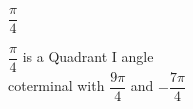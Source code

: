 {$\dfrac{\pi}{4}$}
{$\dfrac{\pi}{4}$ is a Quadrant I angle \\
coterminal with $\dfrac{9 \pi}{4}$ and $-\dfrac{7\pi}{4}$

\begin{center}
\end{center}}